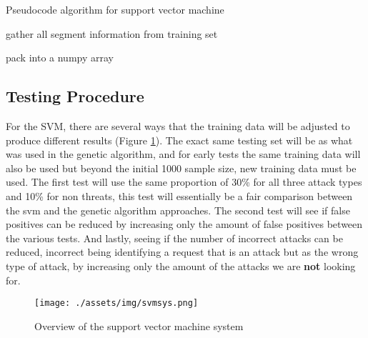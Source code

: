 \begin{algorithm}[H]
	\label{alg:svm}
	\caption{Pseudocode algorithm for support vector machine}
	
	gather all segment information from training set\;
	
	pack into a numpy array\;
	
\end{algorithm}

\subsection{Testing Procedure}

For the SVM, there are several ways that the training data will be adjusted to produce different results (Figure \ref{fig:svmsys}).  The exact same testing set will be as what was used in the genetic algorithm, and for early tests the same training data will also be used but beyond the initial 1000 sample size, new training data must be used.  The first test will use the same proportion of 30\% for all three attack types and 10\% for non threats, this test will essentially be a fair comparison between the svm and the genetic algorithm approaches.  The second test will see if false positives can be reduced by increasing only the amount of false positives between the various tests.  And lastly, seeing if the number of incorrect attacks can be reduced, incorrect being identifying a request that is an attack but as the wrong type of attack, by increasing only the amount of the attacks we are \textbf{not} looking for.

\begin{figure}
	\label{fig:svmsys}
	\texttt{[image: ./assets/img/svmsys.png]}
	\caption{Overview of the support vector machine system}
\end{figure}


